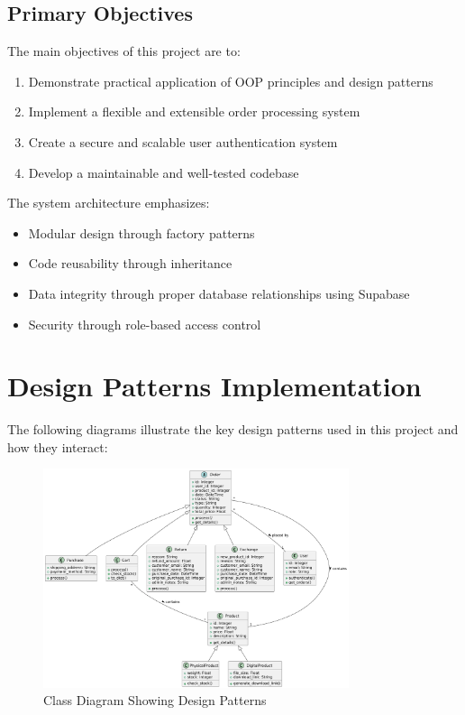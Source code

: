 \documentclass[12pt,a4paper]{article}
\begin{document}
\subsection{Primary Objectives}

The main objectives of this project are to:

\begin{enumerate}
    \item Demonstrate practical application of OOP principles and design patterns
    \item Implement a flexible and extensible order processing system
    \item Create a secure and scalable user authentication system
    \item Develop a maintainable and well-tested codebase
\end{enumerate}

The system architecture emphasizes:
\begin{itemize}
    \item Modular design through factory patterns
    \item Code reusability through inheritance
    \item Data integrity through proper database relationships using Supabase
    \item Security through role-based access control
\end{itemize}
\section{Design Patterns Implementation}
The following diagrams illustrate the key design patterns used in this project and how they interact:

\begin{figure}[H]
    \centering
    \includegraphics[width=0.8\textwidth]{UML diagrams/class_diagram.png}
    \caption{Class Diagram Showing Design Patterns}
\end{figure}
\end{document}
